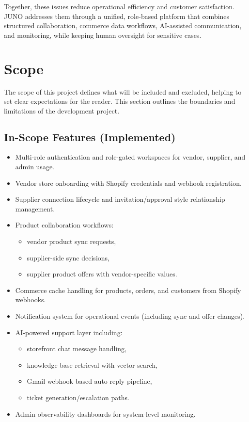 Together, these issues reduce operational efficiency and customer satisfaction. JUNO addresses them through a unified, role-based platform that combines structured collaboration, commerce data workflows, AI-assisted communication, and monitoring, while keeping human oversight for sensitive cases.

\section{Scope}

The scope of this project defines what will be included and excluded, helping to set clear expectations for the reader. This section outlines the boundaries and limitations of the development project.

\subsection{In-Scope Features (Implemented)}

\begin{itemize}
    \item Multi-role authentication and role-gated workspaces for vendor, supplier, and admin usage.
    \item Vendor store onboarding with Shopify credentials and webhook registration.
    \item Supplier connection lifecycle and invitation/approval style relationship management.
    \item Product collaboration workflows:
    \begin{itemize}
        \item vendor product sync requests,
        \item supplier-side sync decisions,
        \item supplier product offers with vendor-specific values.
    \end{itemize}
    \item Commerce cache handling for products, orders, and customers from Shopify webhooks.
    \item Notification system for operational events (including sync and offer changes).
    \item AI-powered support layer including:
    \begin{itemize}
        \item storefront chat message handling,
        \item knowledge base retrieval with vector search,
        \item Gmail webhook-based auto-reply pipeline,
        \item ticket generation/escalation paths.
    \end{itemize}
    \item Admin observability dashboards for system-level monitoring.
\end{itemize}

